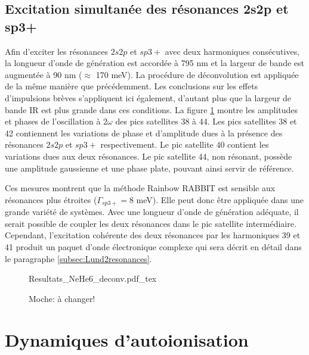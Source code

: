 
\subsection{Excitation simultanée des résonances 2s2p et sp3+}
Afin d'exciter les résonances $2s2p$ et $sp3+$ avec deux harmoniques consécutives, la longueur d'onde de génération est accordée à 795 nm et la largeur de bande est augmentée à 90 nm ($\approx$ 170 meV). La procédure de déconvolution est appliquée de la même manière que précédemment. Les conclusions sur les effets d'impulsions brèves s'appliquent ici également, d'autant plus que la largeur de bande IR est plus grande dans ces conditions. La figure \ref{fig:Resultats_NeHe6_deconv} montre les amplitudes et phases de l'oscillation à $2\omega$ des pics satellites 38 à 44. Les pics satellites 38 et 42 contiennent les variations de phase et d'amplitude dues à la présence des résonances $2s2p$ et $sp3+$ respectivement. Le pic satellite 40 contient les variations dues aux deux résonances. Le pic satellite 44, non résonant, possède une amplitude gaussienne et une phase plate, pouvant ainsi servir de référence.

Ces mesures montrent que la méthode Rainbow RABBIT est sensible aux résonances plus étroites ($\Gamma_{sp3+} = 8$ meV). Elle peut donc être appliquée dans une grande variété de systèmes. Avec une longueur d'onde de génération adéquate, il serait possible de coupler les deux résonances dans le pic satellite intermédiaire. Cependant, l'excitation cohérente des deux résonances par les harmoniques 39 et 41 produit un paquet d'onde électronique complexe qui sera décrit en détail dans le paragraphe \ref{subsec:Lund2resonances}.

\begin{figure}
\centering
\def\svgwidth{\textwidth}
{Resultats_NeHe6_deconv.pdf_tex}
\caption{Moche: à changer!}
\label{fig:Resultats_NeHe6_deconv}
\end{figure}

\section{Dynamiques d'autoionisation}
